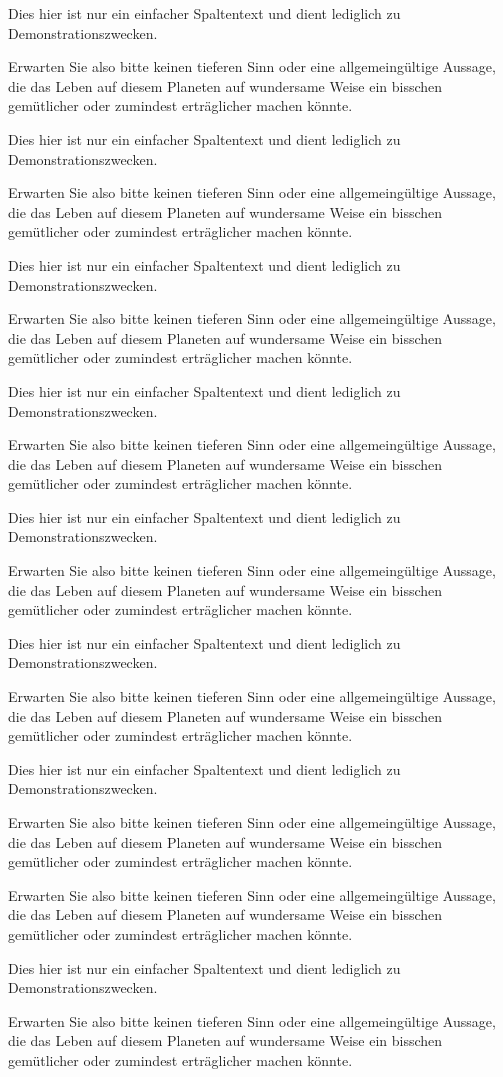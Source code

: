 \documentclass[a4paper,portrait]{scrreprt}
\begin{document}
   Dies hier ist nur ein einfacher Spaltentext und dient lediglich zu Demonstrationszwecken.
  
  Erwarten Sie also bitte keinen tieferen Sinn oder eine allgemeingültige Aussage, die das Leben auf diesem Planeten auf wundersame Weise ein bisschen gemütlicher oder zumindest erträglicher machen könnte.
  
   Dies hier ist nur ein einfacher Spaltentext und dient lediglich zu Demonstrationszwecken.
  
  Erwarten Sie also bitte keinen tieferen Sinn oder eine allgemeingültige Aussage, die das Leben auf diesem Planeten auf wundersame Weise ein bisschen gemütlicher oder zumindest erträglicher machen könnte.
  
   Dies hier ist nur ein einfacher Spaltentext und dient lediglich zu Demonstrationszwecken.
  
  Erwarten Sie also bitte keinen tieferen Sinn oder eine allgemeingültige Aussage, die das Leben auf diesem Planeten auf wundersame Weise ein bisschen gemütlicher oder zumindest erträglicher machen könnte.
  
  Dies hier ist nur ein einfacher Spaltentext und dient lediglich zu Demonstrationszwecken.
  
  Erwarten Sie also bitte keinen tieferen Sinn oder eine allgemeingültige Aussage, die das Leben auf diesem Planeten auf wundersame Weise ein bisschen gemütlicher oder zumindest erträglicher machen könnte.
  
   Dies hier ist nur ein einfacher Spaltentext und dient lediglich zu Demonstrationszwecken.
  
  Erwarten Sie also bitte keinen tieferen Sinn oder eine allgemeingültige Aussage, die das Leben auf diesem Planeten auf wundersame Weise ein bisschen gemütlicher oder zumindest erträglicher machen könnte.
  
   Dies hier ist nur ein einfacher Spaltentext und dient lediglich zu Demonstrationszwecken.
  
  Erwarten Sie also bitte keinen tieferen Sinn oder eine allgemeingültige Aussage, die das Leben auf diesem Planeten auf wundersame Weise ein bisschen gemütlicher oder zumindest erträglicher machen könnte.
  
   Dies hier ist nur ein einfacher Spaltentext und dient lediglich zu Demonstrationszwecken.
  
  Erwarten Sie also bitte keinen tieferen Sinn oder eine allgemeingültige Aussage, die das Leben auf diesem Planeten auf wundersame Weise ein bisschen gemütlicher oder zumindest erträglicher machen könnte.
  
    Erwarten Sie also bitte keinen tieferen Sinn oder eine allgemeingültige Aussage, die das Leben auf diesem Planeten auf wundersame Weise ein bisschen gemütlicher oder zumindest erträglicher machen könnte.
  
   Dies hier ist nur ein einfacher Spaltentext und dient lediglich zu Demonstrationszwecken.
  
  Erwarten Sie also bitte keinen tieferen Sinn oder eine allgemeingültige Aussage, die das Leben auf diesem Planeten auf wundersame Weise ein bisschen gemütlicher oder zumindest erträglicher machen könnte.
\end{document}
